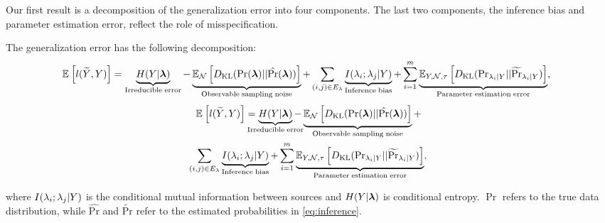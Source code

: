 

Our first result is a decomposition of the generalization error into four components. The last two components, the inference bias and parameter estimation error, reflect the role of misspecification.
\begin{theorem}
The generalization error has the following decomposition:
\ifsinglecolumn
\begin{align}
    &\mathbb{E}_{}\left[l(\widetilde{Y}, Y)\right] = \underbrace{H(Y | \bm{\lambda})}_{{\mathrm{Irreducible \; error}}} - \underbrace{\mathbb{E}_{\mathcal{N}}\left[D_{\mathrm{KL}}(\Pr(\bm{\lambda}) || \hat{\Pr}(\bm{\lambda}))\right]}_{\mathrm{Observable \; sampling \; noise}} + \sum_{{(i, j) \in E_{\lambda}}} \underbrace{I(\lambda_i; \lambda_j | Y)}_{\mathrm{Inference \; bias}} +  \sum_{i = 1}^m \underbrace{\mathbb{E}_{Y, \mathcal{N}, \tau}\left[D_{\mathrm{KL}}(\mathrm{Pr}_{\lambda_i | Y} || \widetilde{\Pr}_{\lambda_i | Y })\right]}_{\mathrm{Parameter \;estimation \;error}} \nonumber,
\end{align}
\else 
\begin{align}
    &\E{}{l(\widetilde{Y}, Y)} = \underbrace{H(Y | \bm{\lf})}_{\mathclap{\mathrm{Irreducible \; error}}} - \underbrace{\E{\N}{\KL(\Pr(\bm{\lf}) || \hat{\Pr}(\bm{\lf}))}}_{\mathrm{Observable \; sampling \; noise}} + \nonumber \\ %
    &\sum_{\mathclap{(i, j) \in E_{\lf}}} \;\;\; \underbrace{I(\lf_i; \lf_j | Y)}_{\mathrm{Inference \; bias}} +  \sum_{i = 1}^m \underbrace{\E{Y, \N, \tau}{\KL(\mathrm{Pr}_{\lf_i | Y} || \widetilde{\Pr}_{\lf_i | Y })}}_{\mathrm{Parameter \;estimation \;error}} \nonumber,
\end{align}
\fi

where $I(\lambda_i; \lambda_j | Y)$ is the conditional mutual information between sources and $H(Y|\bm{\lambda})$ is conditional entropy. $\Pr$ refers to the true data distribution, while $\hat{\mathrm{Pr}}$ and $\widetilde{\mathrm{Pr}}$ refer to the estimated probabilities in \eqref{eq:inference}.

\label{thm:decomposition}
\end{theorem}

